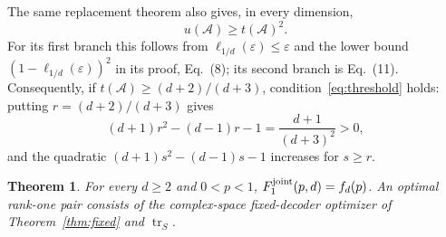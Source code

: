 \documentclass[11pt]{article}
\newcommand{\tr}{\operatorname{tr}}
\newtheorem{theorem}{Theorem}
\begin{document}
The same replacement theorem also gives, in every dimension,
\begin{equation}\label{eq:square-replacement}
 u(\mathcal A)\ge t(\mathcal A)^2.
\end{equation}
For its first branch this follows from $\ell_{1/d}(\varepsilon)\le\varepsilon$
and the lower bound $(1-\ell_{1/d}(\varepsilon))^2$ in its proof,
Eq.~(8); its second branch is Eq.~(11). Consequently, if
$t(\mathcal A)\ge(d+2)/(d+3)$, condition~\eqref{eq:threshold} holds:
putting $r=(d+2)/(d+3)$ gives
\[
 (d+1)r^2-(d-1)r-1=\frac{d+1}{(d+3)^2}>0,
\]
and the quadratic $(d+1)s^2-(d-1)s-1$ increases for $s\ge r$.

\begin{theorem}\label{thm:joint}
For every $d\ge2$ and $0<p<1$, $F_1^{\rm joint}(p,d)=f_d(p)$.
An optimal rank-one pair consists of the complex-space fixed-decoder
optimizer of Theorem~\ref{thm:fixed} and $\tr_S$.
\end{theorem}
\end{document}
